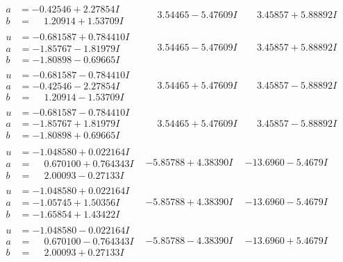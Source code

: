 \documentclass[1p]{elsarticle_modified}
\theoremstyle{definition}
\begin{document}
$$\begin{array}{c|c|c}
\begin{aligned}
a &= -0.42546 + 2.27854 I \\
b &= \phantom{-}1.20914 + 1.53709 I\end{aligned}
 & \phantom{-}3.54465 - 5.47609 I & \phantom{-}3.45857 + 5.88892 I \\ \hline\begin{aligned}
u &= -0.681587 + 0.784410 I \\
a &= -1.85767 - 1.81979 I \\
b &= -1.80898 - 0.69665 I\end{aligned}
 & \phantom{-}3.54465 - 5.47609 I & \phantom{-}3.45857 + 5.88892 I \\ \hline\begin{aligned}
u &= -0.681587 - 0.784410 I \\
a &= -0.42546 - 2.27854 I \\
b &= \phantom{-}1.20914 - 1.53709 I\end{aligned}
 & \phantom{-}3.54465 + 5.47609 I & \phantom{-}3.45857 - 5.88892 I \\ \hline\begin{aligned}
u &= -0.681587 - 0.784410 I \\
a &= -1.85767 + 1.81979 I \\
b &= -1.80898 + 0.69665 I\end{aligned}
 & \phantom{-}3.54465 + 5.47609 I & \phantom{-}3.45857 - 5.88892 I \\ \hline\begin{aligned}
u &= -1.048580 + 0.022164 I \\
a &= \phantom{-}0.670100 + 0.764343 I \\
b &= \phantom{-}2.00093 - 0.27133 I\end{aligned}
 & -5.85788 + 4.38390 I & -13.6960 - 5.4679 I \\ \hline\begin{aligned}
u &= -1.048580 + 0.022164 I \\
a &= -1.05745 + 1.50356 I \\
b &= -1.65854 + 1.43422 I\end{aligned}
 & -5.85788 + 4.38390 I & -13.6960 - 5.4679 I \\ \hline\begin{aligned}
u &= -1.048580 - 0.022164 I \\
a &= \phantom{-}0.670100 - 0.764343 I \\
b &= \phantom{-}2.00093 + 0.27133 I\end{aligned}
 & -5.85788 - 4.38390 I & -13.6960 + 5.4679 I \\ \hline\begin{aligned}

\end{aligned}
\end{array}$$
\end{document}
